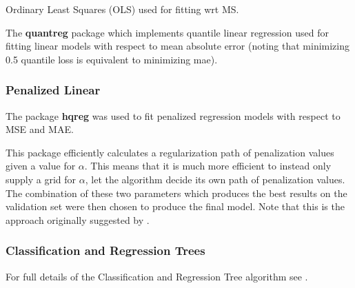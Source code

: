 \documentclass[11pt, a4paper, table]{article}
\begin{document}
Ordinary Least Squares (OLS) used for fitting wrt MS.

The \textbf{quantreg} package which implements quantile linear regression used for fitting linear models with respect to mean absolute error (noting that minimizing 0.5 quantile loss is equivalent to minimizing mae).

\subsubsection{Penalized Linear}

The package \textbf{hqreg} was used to fit penalized regression models with respect to MSE and MAE.

This package efficiently calculates a regularization path of penalization values given a value for $\alpha$. This means that it is much more efficient to instead only supply a grid for $\alpha$, let the algorithm decide its own path of penalization values. The combination of these two parameters which produces the best results on the validation set were then chosen to produce the final model. Note that this is the approach originally suggested by \cite{zou_regularization_2005}.

\subsubsection{Classification and Regression Trees}

For full details of the Classification and Regression Tree algorithm see \cite{breiman_classification_1984}. 
\end{document}
